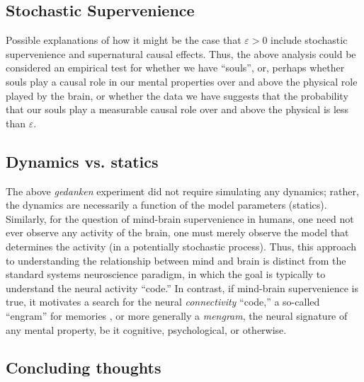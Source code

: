 \documentclass{article}
\newcommand{\eps}{\varepsilon}
\begin{document}


\subsection{Stochastic Supervenience} %
\label{par:stochastic_supervenience}


Possible explanations of how it might be the case that $\eps>0$ include stochastic supervenience \cite{Craver09} and supernatural causal effects.  Thus, the above analysis could be considered an empirical test for whether we have ``souls'', or, perhaps whether souls play a causal role in our mental properties over and above the physical role played by the brain, or whether the data we have suggests that the probability that our souls play a measurable causal role over and above the physical is less than $\eps$.



\subsection{Dynamics vs. statics} %
\label{par:dynamics_vs_statics}

The above \emph{gedanken} experiment did not require simulating any dynamics; rather, the dynamics are necessarily a function of the model parameters (statics).  Similarly, for the question of mind-brain supervenience in humans, one need not ever observe any activity of the brain, one must merely observe the model that determines the activity (in a potentially stochastic process). Thus, this approach to understanding the relationship between mind and brain is distinct from the standard systems neuroscience paradigm, in which the goal is typically to understand the neural activity ``code.''  In contrast, if mind-brain supervenience is true, it motivates a search for the neural \emph{connectivity} ``code,'' a so-called ``engram''  for memories \cite{Semon21, Lashley50, ZhangLinden03, ShemaDudai07, BerryDavis08}, or more generally a \emph{mengram}, the neural signature of any mental property, be it cognitive, psychological, or otherwise.  


\subsection{Concluding thoughts} %
\label{par:concluding_thoughts}
\end{document}
